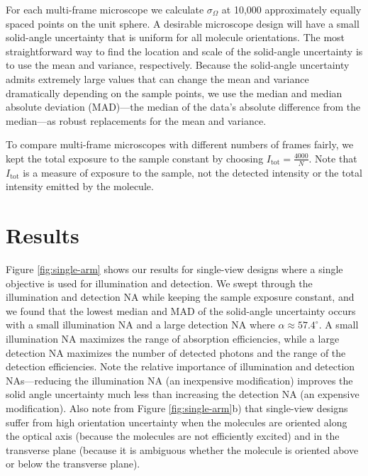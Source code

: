 \documentclass[10pt]{article}
\begin{document}
For each multi-frame microscope we calculate $\sigma_{\Omega}$ at 10,000
approximately equally spaced points on the unit sphere. A desirable microscope
design will have a small solid-angle uncertainty that is uniform for all
molecule orientations. The most straightforward way to find the location and
scale of the solid-angle uncertainty is to use the mean and variance,
respectively. Because the solid-angle uncertainty admits extremely large values
that can change the mean and variance dramatically depending on the sample
points, we use the median and median absolute deviation (MAD)---the median of
the data's absolute difference from the median---as robust replacements for the
mean and variance.

To compare multi-frame microscopes with different numbers of frames fairly, we
kept the total exposure to the sample constant by choosing
$I_{\text{tot}} = \frac{4000}{N}$. Note that $I_{\text{tot}}$ is a measure of
exposure to the sample, not the detected intensity or the total intensity
emitted by the molecule.

\section{Results}\label{results}
Figure \ref{fig:single-arm} shows our results for single-view designs where a
single objective is used for illumination and detection. We swept through the
illumination and detection NA while keeping the sample exposure constant, and we
found that the lowest median and MAD of the solid-angle uncertainty occurs with
a small illumination NA and a large detection NA where
$\alpha \approx 57.4^{\circ}$. A small illumination NA maximizes the range of
absorption efficiencies, while a large detection NA maximizes the number of
detected photons and the range of the detection efficiencies. Note the relative
importance of illumination and detection NAs---reducing the illumination NA (an
inexpensive modification) improves the solid angle uncertainty much less than
increasing the detection NA (an expensive modification). Also note from Figure
\ref{fig:single-arm}b) that single-view designs suffer from high orientation
uncertainty when the molecules are oriented along the optical axis (because the
molecules are not efficiently excited) and in the transverse plane (because it
is ambiguous whether the molecule is oriented above or below the transverse
plane).
\end{document}
